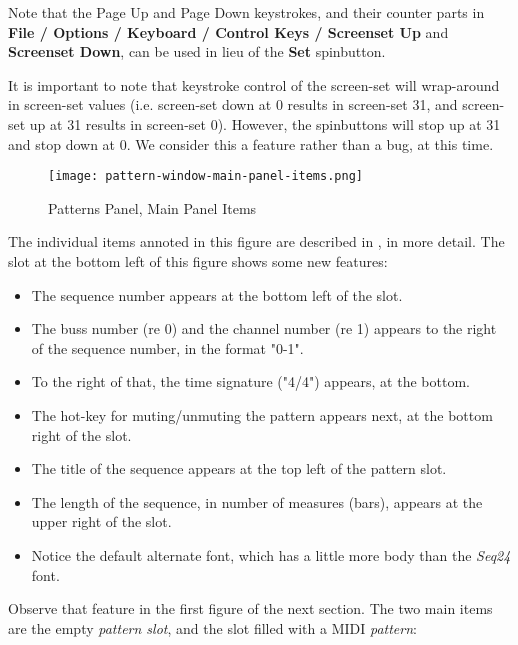   Note that the Page Up and Page Down keystrokes, and their
   counter parts in
   \textbf{File / Options / Keyboard / Control Keys / Screenset Up}
   and \textbf{Screenset Down}, can be used in lieu of the
   \textbf{Set} spinbutton.

   It is important to note that keystroke control of the screen-set will
   wrap-around in screen-set values (i.e. screen-set down at 0 results in
   screen-set 31, and screen-set up at 31 results in screen-set 0).
   However, the spinbuttons will stop up at 31 and stop down at 0.
   We consider this a feature rather than a bug, at this time.

\begin{figure}[H]
   \centering 
   \texttt{[image: pattern-window-main-panel-items.png]}
   \caption{Patterns Panel, Main Panel Items}
   \label{fig:pattern_window_main_panel_items}
\end{figure}

   The individual items annoted in this figure are described in
   , in more detail.
   The slot at the bottom left of this figure shows some new features:

   \begin{itemize}
      \item The sequence number appears at the bottom left of the slot.
      \item The buss number (re 0) and the channel number (re 1) appears
         to the right of the sequence number, in the format "0-1".
      \item To the right of that, the time signature ("4/4") appears, at the
         bottom.
      \item The hot-key for muting/unmuting the pattern appears next,
         at the bottom right of the slot.
      \item The title of the sequence appears at the top left of the pattern
         slot.
      \item The length of the sequence, in number of measures (bars), appears
         at the upper right of the slot.
      \item Notice the default alternate font, which has a little more body
         than the \textsl{Seq24} font.
   \end{itemize}

   Observe that feature in the first figure of the next section.
   The two main items are the empty \textsl{pattern slot}, and the slot filled
   with a MIDI \textsl{pattern}:

